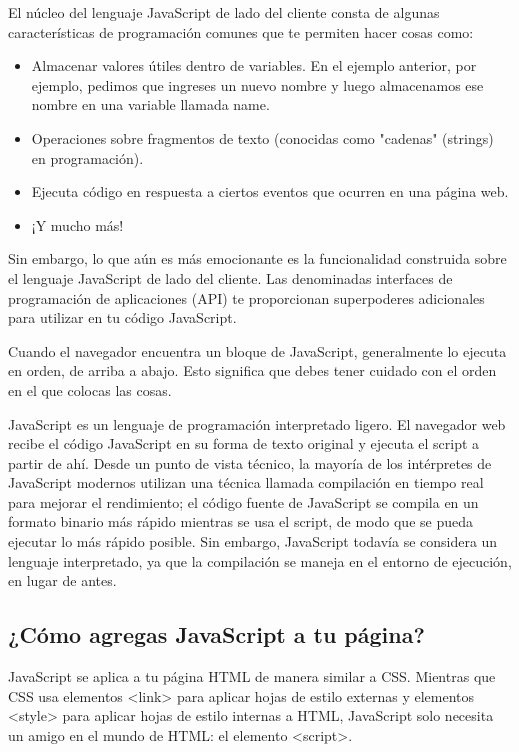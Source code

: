 \begin{enumerate}
El núcleo del lenguaje JavaScript de lado del cliente consta de algunas características de programación comunes que te permiten hacer cosas como:

\begin{itemize}
	\item Almacenar valores útiles dentro de variables. En el ejemplo anterior, por ejemplo, pedimos que ingreses un nuevo nombre y luego almacenamos ese nombre en una variable llamada name.
	\item Operaciones sobre fragmentos de texto (conocidas como "cadenas" (strings) en programación).
	\item Ejecuta código en respuesta a ciertos eventos que ocurren en una página web.
	\item ¡Y mucho más!
\end{itemize}

Sin embargo, lo que aún es más emocionante es la funcionalidad construida sobre el lenguaje JavaScript de lado del cliente. Las denominadas interfaces de programación de aplicaciones (API) te proporcionan superpoderes adicionales para utilizar en tu código JavaScript.

Cuando el navegador encuentra un bloque de JavaScript, generalmente lo ejecuta en orden, de arriba a abajo. Esto significa que debes tener cuidado con el orden en el que colocas las cosas.

JavaScript es un lenguaje de programación interpretado ligero. El navegador web recibe el código JavaScript en su forma de texto original y ejecuta el script a partir de ahí. Desde un punto de vista técnico, la mayoría de los intérpretes de JavaScript modernos utilizan una técnica llamada compilación en tiempo real para mejorar el rendimiento; el código fuente de JavaScript se compila en un formato binario más rápido mientras se usa el script, de modo que se pueda ejecutar lo más rápido posible. Sin embargo, JavaScript todavía se considera un lenguaje interpretado, ya que la compilación se maneja en el entorno de ejecución, en lugar de antes.

\subsection{¿Cómo agregas JavaScript a tu página?}
JavaScript se aplica a tu página HTML de manera similar a CSS. Mientras que CSS usa elementos <link> para aplicar hojas de estilo externas y elementos <style> para aplicar hojas de estilo internas a HTML, JavaScript solo necesita un amigo en el mundo de HTML: el elemento <script>.


\end{enumerate}
